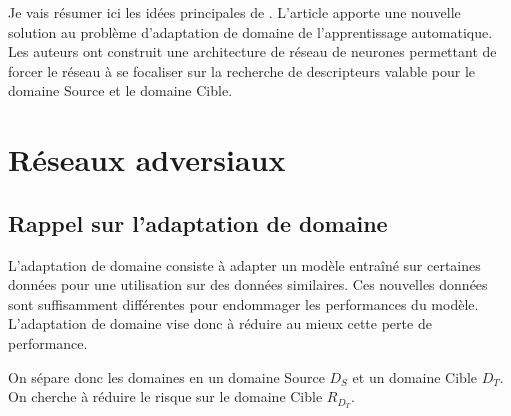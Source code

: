 \documentclass[accepted]{article} %
\begin{document}
 



Je vais résumer ici les idées principales de \cite{Ganin15}.
L'article apporte une nouvelle solution au problème d'adaptation de domaine
de l'apprentissage automatique. Les auteurs ont construit une architecture de
réseau de neurones permettant de forcer le réseau à se focaliser sur la 
recherche de descripteurs valable pour le domaine Source et le domaine Cible.


\section{Réseaux adversiaux} %
\label{sec:reseaux_adversiaux}
\subsection{Rappel sur l'adaptation de domaine} %
\label{sub:rappel}

L'adaptation de domaine consiste à adapter un modèle entraîné sur certaines
données pour une utilisation sur des données similaires.
Ces nouvelles données sont suffisamment différentes pour endommager les 
performances du modèle. L'adaptation de domaine vise donc à réduire au mieux
cette perte de performance.

On sépare donc les domaines en un domaine Source $D_S$ et un domaine Cible
$D_T$. On cherche à réduire le risque sur le domaine Cible $R_{D_T}$.
\end{document}
